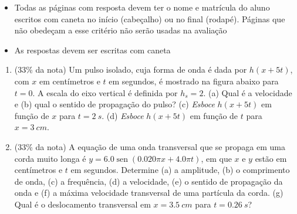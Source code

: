 \documentclass[12pt,a4paper,brazilian, fleqn]{article}
\DeclareMathOperator{\sen}{sen}
\newcommand{\ratio}[1]{(#1\% da nota)}
\begin{document}
\begin{tcolorbox}[colback=black!10, colframe=black!50, title=Observações]
    \begin{itemize}
        \item Todas as páginas com resposta devem ter o nome e matrícula do aluno
            escritos com caneta no início (cabeçalho) ou no final (rodapé). Páginas
            que não obedeçam a esse critério não serão usadas na avaliação
        \item As respostas devem ser escritas com caneta
    \end{itemize}
\end{tcolorbox}

\begin{enumerate}
    \item \ratio{33} Um pulso isolado, cuja forma de onda é dada por \(h(x + 5t)\), com \(x\) em centímetros e 
        \(t\) em segundos, é mostrado na figura abaixo para \(t = 0\). A escala do eixo vertical é definida 
        por \(h_s = 2\). (a) Qual é a velocidade e (b) qual o sentido de propagação do pulso? 
        (c) \textit{Esboce} \(h(x + 5t)\) em função de \(x\) para \(t = \SI{2}{s}\). (d) \textit{Esboce} \(h(x + 5t)\)
        em função de \(t\) para \(x = \SI{3}{cm}\).

        \begin{center}
        \end{center}

    \item \ratio{33} A equação de uma onda transversal que se propaga em uma corda muito longa é 
        \(y = \num{6.0} \sen{(\num{0.020}\pi x + \num{4.0}\pi t)}\), em que \(x\) e
        \(y\) estão em centímetros e \(t\) em segundos. Determine (a) a amplitude,
        (b) o comprimento de onda, (c) a frequência, (d) a velocidade, (e) o 
        sentido de propagação da onda e (f) a máxima velocidade transversal de uma 
        partícula da corda. (g) Qual é o deslocamento transversal em 
        \( x = \SI{3.5}{cm}\) para \(t = \SI{0,26}{s}\)?


\end{enumerate}
\end{document}
